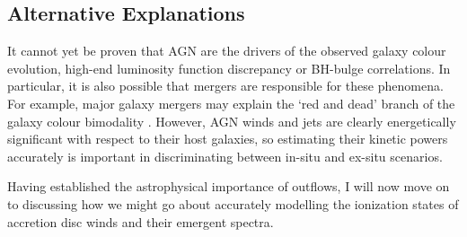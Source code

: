 \subsection{Alternative Explanations}

It cannot yet be proven that AGN are the drivers of the observed 
galaxy colour evolution, high-end luminosity function discrepancy or
BH-bulge correlations. 
In particular, it is also possible that mergers are responsible for these phenomena. 
For example, major galaxy mergers may explain the `red and dead' branch
of the galaxy colour bimodality \citep[e.g.][]{somerville2001,baldry2004}. 
However, AGN winds and jets are clearly 
energetically significant with respect to their host galaxies, so estimating
their kinetic powers accurately is important in discriminating between in-situ
and ex-situ scenarios. 

Having established the astrophysical importance of outflows, 
I will now move on to discussing how we might go about 
accurately modelling the ionization states of accretion disc winds 
and their emergent spectra.


